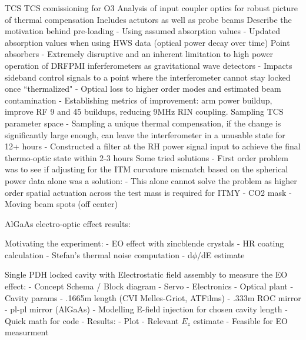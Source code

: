 

TCS
    TCS comissioning for O3
      Analysis of input coupler optics for robust picture of thermal compensation
      Includes actutors as well as probe beams
      Describe the motivation behind pre-loading
        - Using assumed absorption values
        - Updated absorption values when using HWS data (optical power decay over time)
      Point absorbers
        - Extremely disruptive and an inherent limitation to high power operation of DRFPMI inferferometers as gravitational wave detectors
          - Impacts sideband control signals to a point where the interferometer cannot stay locked once ``thermalized"
          - Optical loss to higher order modes and estimated beam contamination
        - Establishing metrics of improvement: arm power buildup, improve RF 9 and 45 buildups, reducing 9MHz RIN coupling.
      Sampling TCS parameter space
          - Sampling a unique thermal compensation, if the change is significantly large enough, can leave the interferometer in a unusable state for 12+ hours
          - Constructed a filter at the RH power signal input to achieve the final thermo-optic state within 2-3 hours
      Some tried solutions
          - First order problem was to see if adjusting for the ITM curvature mismatch based on the spherical power data alone was a solution:
            - This alone cannot solve the problem as higher order spatial actuation across the test mass is required for ITMY
          - CO2 mask
          - Moving beam spots (off center)


AlGaAs electro-optic effect results:

  Motivating the experiment:
    - EO effect with zincblende crystals
    - HR coating calculation
      - Stefan's thermal noise computation
    - d$\phi$/dE estimate

  Single PDH locked cavity with Electrostatic field assembly to measure the EO effect:
    - Concept Schema / Block diagram
    - Servo
      - Electronics
      - Optical plant
        - Cavity params
          - .1665m length (CVI Melles-Griot, ATFilms)
          - .333m ROC mirror
          - pl-pl mirror (AlGaAs)
        - Modelling E-field injection for chosen cavity length
          - Quick math for code
          - Results:
            - Plot
            - Relevant $E_z$ estimate
            - Feasible for EO measurment
            

